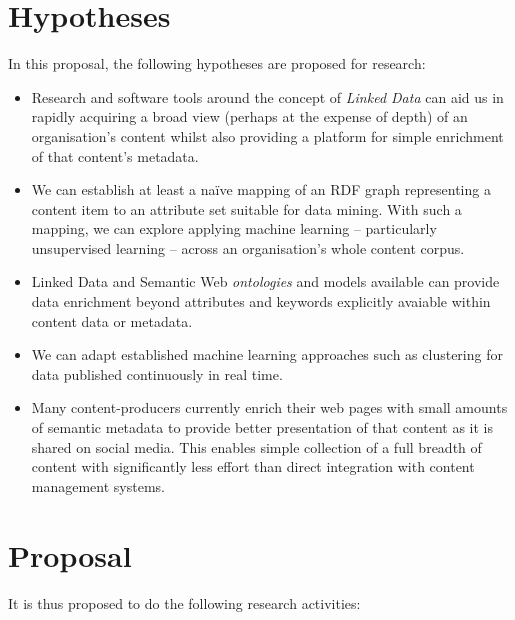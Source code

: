 \documentclass[10pt,a4paper]{article}
\begin{document}
\section{Hypotheses}

In this proposal, the following hypotheses are proposed for research:

\begin{itemize}

\item Research and software tools around the concept of \emph{Linked Data} can aid
us in rapidly acquiring a broad view (perhaps at the expense of depth) of an
organisation's content whilst also providing a platform for simple enrichment of
that content's metadata.

\item We can establish at least a na\"ive mapping of an RDF graph representing a
content item to an attribute set suitable for data mining. With such a mapping,
we can explore applying machine learning -- particularly unsupervised learning
-- across an organisation's whole content corpus.

\item Linked Data and Semantic Web \emph{ontologies} and models available can
provide data enrichment beyond attributes and keywords explicitly avaiable
within content data or metadata.

\item We can adapt established machine learning approaches such as clustering
for data published continuously in real time.

\item Many content-producers currently enrich their web pages with small
amounts of semantic metadata to provide better presentation of that content
as it is shared on social media. This enables simple collection of a full
breadth of content with significantly less effort than direct integration
with content management systems.

\end{itemize}

\section{Proposal}

It is thus proposed to do the following research activities:
\end{document}

